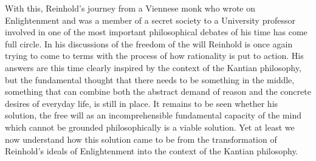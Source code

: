  With this, Reinhold's journey from a Viennese monk who wrote on Enlightenment and was a member of a secret society to a University professor involved in one of the most important philosophical debates of his time has come full circle. In his discussions of the freedom of the will Reinhold is once again trying to come to terms with the process of how rationality is put to action. His answers are this time clearly inspired by the context of the Kantian philosophy, but the fundamental thought that there needs to be something in the middle, something that can combine both the abstract demand of reason and the concrete desires of everyday life, is still in place. It remains to be seen whether his solution, the free will as an incomprehensible fundamental capacity of the mind which cannot be grounded philosophically is a viable solution. Yet at least we now understand how this solution came to be from the transformation of Reinhold's ideals of Enlightenment into the context of the Kantian philosophy. 

